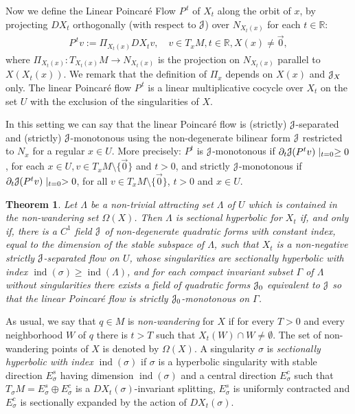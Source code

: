 \documentclass[12pt,reqno]{amsart}
\numberwithin{equation}{section}
\theoremstyle{plain}
\newtheorem{maintheorem}{Theorem}
\theoremstyle{definition}
\newcommand{\RR}{{\mathbb R}}
\newcommand{\indi}{\operatorname{ind}}
\newcommand{\J}{\EuScript{J}}
\begin{document}
Now we define the Linear Poincar\'e Flow $P^{\, t}$ of $X_t$
along the orbit of $x$, by projecting $DX_t$ orthogonally
(with respect to $\J$) over $N_{X_t(x)}$ for each $t\in\RR$:
\begin{align*}
  P^{\, t} v := \Pi_{X_t(x)}DX_t v ,
  \quad
  v\in T_x M, t\in\RR, X(x)\neq\vec0,
\end{align*}
where $\Pi_{X_t(x)}:T_{X_t(x)}M\to N_{X_t(x)}$ is the
projection on $N_{X_t(x)}$ parallel to $X(X_t(x))$.  We
remark that the definition of $\Pi_x$ depends on $X(x)$ and
$\J_X$ only. The linear Poincar\'e flow $P^{\,t}$ is a linear
multiplicative cocycle over $X_t$ on the set $U$ with the
exclusion of the singularities of $X$.

In this setting we can say that the linear Poincar\'e flow is
(strictly) $\J$-separated and (strictly) $\J$-monotonous
using the non-degenerate bilinear form $\J$ restricted to
$N_x$ for a regular $x\in U$. More precisely: $P^t$ is
$\J$-monotonous if $\partial_t\J(P^tv)\mid_{t=0}\ge0$, for
each $x\in U, v\in T_xM\setminus\{\vec0\}$ and $t>0$, and
strictly $\J$-monotonous if $\partial_t\J(P^tv)\mid_{t=0}>0$,
for all $v\in T_xM\setminus\{\vec0\}$, $t>0$ and $x\in
U$.


\begin{maintheorem}\label{mthm:2-sec-exp-J-monot}
  Let $\Lambda$ be a non-trivial attracting set
  $\Lambda$ of $U$ which is contained in the
  non-wandering set $\Omega(X)$.  Then $\Lambda$ is
  sectional hyperbolic for $X_t$ if, and only if, there
  is a $C^1$ field $\J$ of non-degenerate quadratic
  forms with constant index, equal to the dimension of
  the stable subspace of $\Lambda$, such that $X_t$ is
  a non-negative strictly $\J$-separated flow on $U$,
  whose singularities are sectionally hyperbolic with
  index $\indi(\sigma)\ge\indi(\Lambda)$, and for each
  compact invariant subset $\Gamma$ of $\Lambda$
  without singularities there exists a field of
  quadratic forms $\J_0$ equivalent to $\J$ so that the linear
  Poincar\'e flow is strictly $\J_0$-monotonous on
  $\Gamma$.
\end{maintheorem}

As usual, we say that $q\in M$ is {\em non-wandering}
for $X$ if for every $T>0$ and every neighborhood $W$
of $q$ there is $t>T$ such that $X_t(W)\cap W\neq
\emptyset$.  The set of non-wandering points of $X$ is
denoted by $\Omega(X)$.  A singularity $\sigma$ is
\emph{sectionally hyperbolic with index
  $\indi(\sigma)$} if $\sigma$ is a hyperbolic singularity
with stable direction $E^s_\sigma$ having dimension $\indi(\sigma)$
and a central direction $E^c_\sigma$ such that
$T_\sigma M=E^s_\sigma\oplus E^c_\sigma$ is a
$DX_t(\sigma)$-invariant splitting, $E^s_\sigma$ is
uniformly contracted and $E^c_\sigma$ is sectionally
expanded by the action of $DX_t(\sigma)$.
\end{document}
